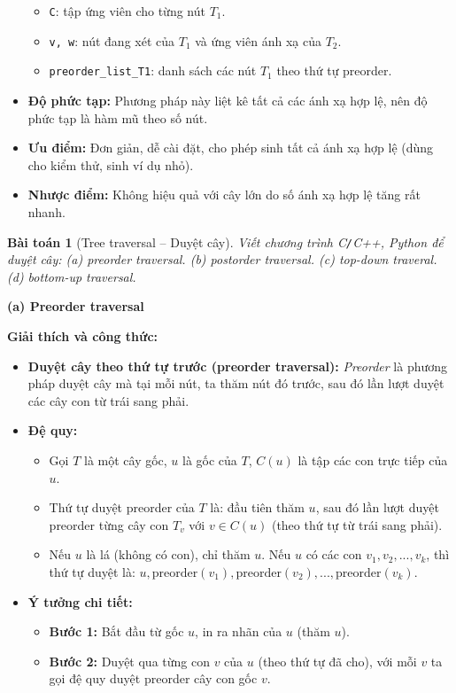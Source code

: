 \documentclass{article}
\newtheorem{baitoan}{Bài toán}
\begin{document}
\begin{itemize}
\begin{itemize}
        \item \texttt{C}: tập ứng viên cho từng nút $T_1$.
        \item \texttt{v, w}: nút đang xét của $T_1$ và ứng viên ánh xạ của $T_2$.
        \item \texttt{preorder\_list\_T1}: danh sách các nút $T_1$ theo thứ tự preorder.
    \end{itemize}
    \item \textbf{Độ phức tạp:} Phương pháp này liệt kê tất cả các ánh xạ hợp lệ, nên độ phức tạp là hàm mũ theo số nút.
    \item \textbf{Ưu điểm:} Đơn giản, dễ cài đặt, cho phép sinh tất cả ánh xạ hợp lệ (dùng cho kiểm thử, sinh ví dụ nhỏ).
    \item \textbf{Nhược điểm:} Không hiệu quả với cây lớn do số ánh xạ hợp lệ tăng rất nhanh.
\end{itemize}


\begin{baitoan}[Tree traversal -- Duyệt cây]
    Viết chương trình {\sf C{\tt/}C++, Python} để duyệt cây: (a) preorder traversal. (b) postorder traversal. (c) top-down traveral. (d) bottom-up traversal.
\end{baitoan}

\textbf{(a) Preorder traversal}

\textbf{Giải thích và công thức:}

\begin{itemize}
    \item \textbf{Duyệt cây theo thứ tự trước (preorder traversal):} \textit{Preorder} là phương pháp duyệt cây mà tại mỗi nút, ta thăm nút đó trước, sau đó lần lượt duyệt các cây con từ trái sang phải.
    \item \textbf{Đệ quy:}
    \begin{itemize}
        \item Gọi $T$ là một cây gốc, $u$ là gốc của $T$, $C(u)$ là tập các con trực tiếp của $u$.
        \item Thứ tự duyệt preorder của $T$ là: đầu tiên thăm $u$, sau đó lần lượt duyệt preorder từng cây con $T_v$ với $v \in C(u)$ (theo thứ tự từ trái sang phải).
        \item Nếu $u$ là lá (không có con), chỉ thăm $u$. Nếu $u$ có các con $v_1, v_2, ..., v_k$, thì thứ tự duyệt là: $u, \text{preorder}(v_1), \text{preorder}(v_2), ..., \text{preorder}(v_k)$.
    \end{itemize}
    \item \textbf{Ý tưởng chi tiết:}
    \begin{itemize}
        \item \textbf{Bước 1:} Bắt đầu từ gốc $u$, in ra nhãn của $u$ (thăm $u$).
        \item \textbf{Bước 2:} Duyệt qua từng con $v$ của $u$ (theo thứ tự đã cho), với mỗi $v$ ta gọi đệ quy duyệt preorder cây con gốc $v$.
    \end{itemize}
\end{itemize}
\end{document}
